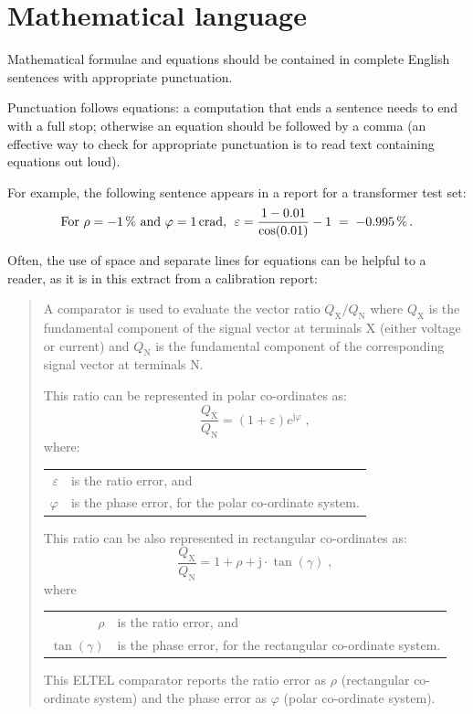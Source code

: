 \section{Mathematical language}
Mathematical formulae and equations should be contained in complete English sentences with appropriate punctuation. 

Punctuation follows equations: a computation that ends a sentence needs to end with a full stop; otherwise an equation should be followed by a comma (an effective way to check for appropriate punctuation is to read text containing equations out loud). 

For example, the following sentence appears in a report for a transformer test set: 
\[
\text{For $\rho = \SI{-1}{\%}$ and $\varphi= \SI{1}{crad}$,\; }
\varepsilon = \frac{1-0.01}{\cos(0.01)} - 1 \; =\; \SI{-0.995}{\%}\,. 
\]

Often, the use of space and separate lines for equations can be helpful to a reader, as it is in this extract from a calibration report:
\begin{quote}

A comparator is used to evaluate the vector ratio $Q_\mathrm{X}/Q_\mathrm{N}$ where $Q_\mathrm{X}$ is the fundamental component of the signal vector at terminals X (either voltage or current) and $Q_\mathrm{N}$ is the fundamental component of the corresponding signal vector at terminals N. 

This ratio can be represented in polar co-ordinates as:
\[
\frac{Q_\mathrm{X}}{Q_\mathrm{N}} = (1 + \varepsilon) e^{\mathrm{j}\varphi} \;,
\]
where:

\begin{tabular}{rl}
$\varepsilon$ & is the ratio error, and \\
$\varphi$ & is the phase error, for the polar co-ordinate system. 
\end{tabular}

\vspace{\baselineskip}
This ratio can be also represented in rectangular co-ordinates as:
\[
\frac{Q_\mathrm{X}}{Q_\mathrm{N}} = 1 + \rho + \mathrm{j}\cdot\tan (\gamma) \;,
\]
where
\begin{tabular}{rl}
	$\rho$ &  is the ratio error, and \\
	$\tan (\gamma)$ & is the phase error, for the rectangular co-ordinate system. 
\end{tabular}

\vspace{\baselineskip}	
This ELTEL comparator reports the ratio error as $\rho$ (rectangular co-ordinate system) and the phase error as $\varphi$ (polar co-ordinate system).
\end{quote}


